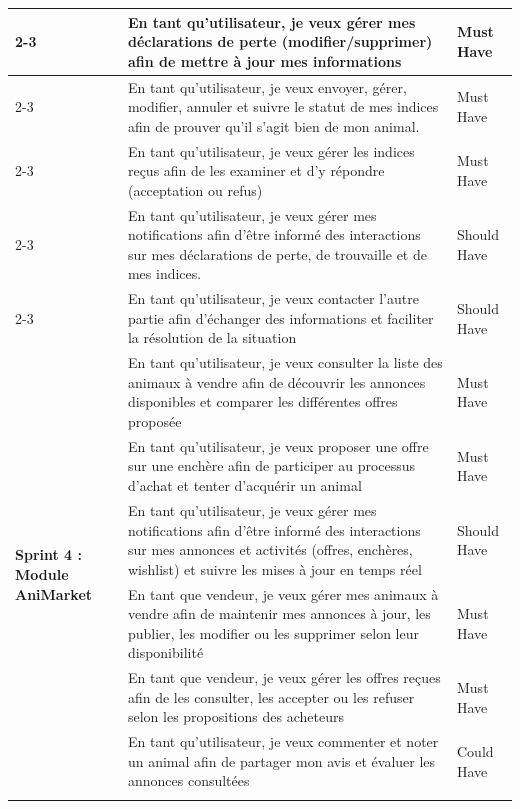 \begin{longtable}{|p{4cm}|p{9.5cm}|p{2cm}|}
\cline{2-3}
& En tant qu'utilisateur, je veux gérer mes déclarations de perte (modifier/supprimer) afin de mettre à jour mes informations & Must Have \\
\cline{2-3}
& En tant qu’utilisateur, je veux envoyer, gérer, modifier, annuler et suivre le statut de mes indices afin de prouver qu’il s’agit bien de mon animal. & Must Have \\
\cline{2-3}
& En tant qu’utilisateur, je veux gérer les indices reçus afin de les examiner et d’y répondre (acceptation ou refus) & Must Have \\
\cline{2-3}
& En tant qu’utilisateur, je veux gérer mes notifications afin d’être informé des interactions sur mes déclarations de perte, de trouvaille et de mes indices. & Should Have \\
\cline{2-3}
& En tant qu’utilisateur, je veux contacter l’autre partie afin d’échanger des informations et faciliter la résolution de la situation & Should Have \\
\hline
\multirow{10}{4cm}{\textbf{Sprint 4 : Module AniMarket}}
&En tant qu’utilisateur, je veux consulter la liste des animaux à vendre afin de découvrir les annonces disponibles et comparer les différentes offres proposée & Must Have \\
\cline{2-3}

& En tant qu’utilisateur, je veux proposer une offre sur une enchère afin de participer au processus d’achat et tenter d’acquérir un animal & Must Have \\
\cline{2-3}

& En tant qu’utilisateur, je veux gérer mes notifications afin d’être informé des interactions sur mes annonces et activités (offres, enchères, wishlist) et suivre les mises à jour en temps réel & Should Have \\
\cline{2-3}

& En tant que vendeur, je veux gérer mes animaux à vendre afin de maintenir mes annonces à jour, les publier, les modifier ou les supprimer selon leur disponibilité & Must Have \\
\cline{2-3}
& En tant que vendeur, je veux gérer les offres reçues afin de les consulter, les accepter ou les refuser selon les propositions des acheteurs  & Must Have \\
\cline{2-3}

& En tant qu’utilisateur, je veux commenter et noter un animal afin de partager mon avis et évaluer les annonces consultées  & Could Have \\
\cline{2-3}


\end{longtable}
